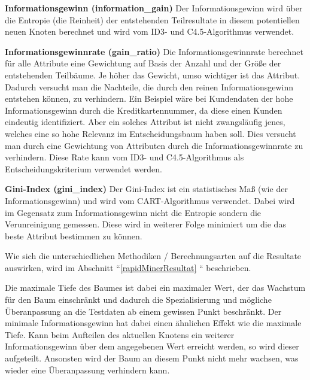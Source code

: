 \begin{pitemize}
\item \textbf{Informationsgewinn (information\_gain)} Der Informationsgewinn wird über die Entropie (die Reinheit) der entstehenden Teilresultate in diesem potentiellen neuen Knoten berechnet und wird vom ID3- und C4.5-Algorithmus verwendet.
\item \textbf{Informationsgewinnrate (gain\_ratio)} Die Informationsgewinnrate berechnet für alle Attribute eine Gewichtung auf Basis der Anzahl und der Größe der entstehenden Teilbäume. Je höher das Gewicht, umso wichtiger ist das Attribut. Dadurch versucht man die Nachteile, die durch den reinen Informationsgewinn entstehen können, zu verhindern. Ein Beispiel wäre bei Kundendaten der hohe Informationsgewinn durch die Kreditkartennummer, da diese einen Kunden eindeutig identifiziert. Aber ein solches Attribut ist nicht zwangsläufig jenes, welches eine so hohe Relevanz im Entscheidungsbaum haben soll. Dies versucht man durch eine Gewichtung von Attributen durch die Informationsgewinnrate zu verhindern. Diese Rate kann vom ID3- und C4.5-Algorithmus als Entscheidungskriterium verwendet werden. \cite{rapidminer_rapidminer_2015} \cite{johannes_furnkranz_decision-tree_2008} 
\item \textbf{Gini-Index (gini\_index)} Der Gini-Index ist ein statistisches Maß (wie der Informationsgewinn) und wird vom CART-Algorithmus verwendet. Dabei wird im Gegensatz zum Informationsgewinn nicht die Entropie sondern die Verunreinigung gemessen. Diese wird in weiterer Folge minimiert um die das beste Attribut bestimmen zu können. \cite{johannes_furnkranz_decision-tree_2008}
\end{pitemize}

Wie sich die unterschiedlichen Methodiken / Berechnungsarten auf die Resultate auswirken, wird im Abschnitt ``\ref{rapidMinerResultat} `` beschrieben.

Die maximale Tiefe des Baumes ist dabei ein maximaler Wert, der das Wachstum für den Baum einschränkt und dadurch die Spezialisierung und mögliche Überanpassung an die Testdaten ab einem gewissen Punkt beschränkt. Der minimale Informationsgewinn hat dabei einen ähnlichen Effekt wie die maximale Tiefe. Kann beim Aufteilen des aktuellen Knotens ein weiterer Informationsgewinn über dem angegebenen Wert erreicht werden, so wird dieser aufgeteilt. Ansonsten wird der Baum an diesem Punkt nicht mehr wachsen, was wieder eine Überanpassung verhindern kann. \cite{rapidminer_rapidminer_2015}

